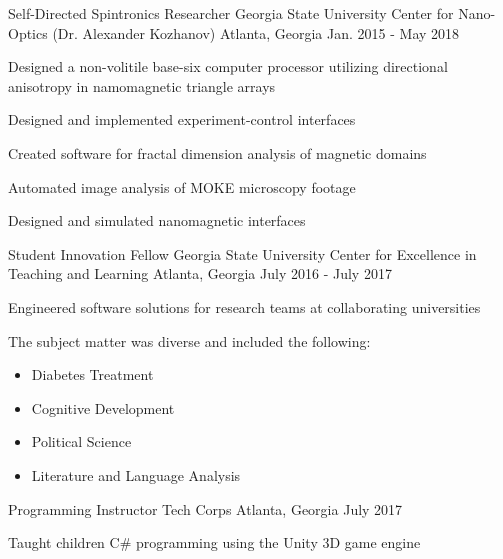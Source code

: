 \begin{cventries}

\cventry
{Self-Directed Spintronics Researcher} %
{Georgia State University Center for Nano-Optics (Dr. Alexander Kozhanov)} %
{Atlanta, Georgia} %
{Jan. 2015 - May 2018} %
{ %
\begin{cvitems}
\item {Designed a non-volitile base-six computer processor utilizing directional anisotropy in namomagnetic \newline triangle arrays}
\item {Designed and implemented experiment-control interfaces}
\item {Created software for fractal dimension analysis of magnetic domains}
\item {Automated image analysis of MOKE microscopy footage}
\item {Designed and simulated nanomagnetic interfaces}
\end{cvitems} 
}


\cventry
{Student Innovation Fellow} %
{Georgia State University Center for Excellence in Teaching and Learning} %
{Atlanta, Georgia} %
{July 2016 - July 2017} %
{ %
\begin{cvitems}
\item {Engineered software solutions for research teams at collaborating universities}
\item {The subject matter was diverse and included the following:}
\begin{itemize}
\item{Diabetes Treatment}
\item{Cognitive Development}
\item{Political Science}
\item{Literature and Language Analysis}
\end{itemize}
\end{cvitems}
}


\cventry
{Programming Instructor} %
{Tech Corps} %
{Atlanta, Georgia} %
{July 2017} %
{ %
\begin{cvitems}
\item {Taught children C\# programming using the Unity 3D game engine}
\end{cvitems}
}


\end{cventries}
